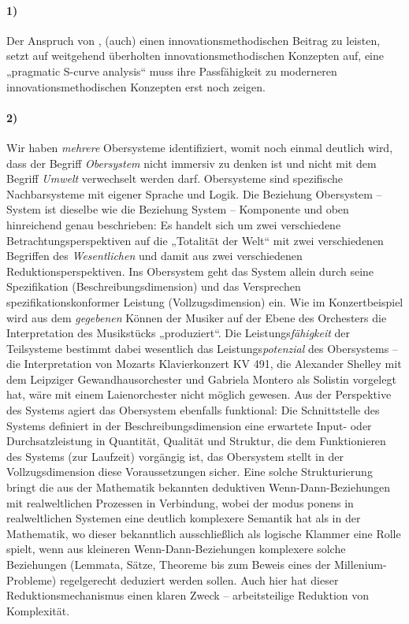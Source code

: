 \documentclass[11pt,a4paper]{article}
\begin{document}
\paragraph{1)}
Der Anspruch von \cite{TESE2018}, (auch) einen innovationsmethodischen Beitrag
zu leisten, setzt auf weitgehend überholten innovationsmethodischen Konzepten
auf, eine „pragmatic S-curve analysis“ muss ihre Passfähigkeit zu moderneren
innovationsmethodischen Konzepten erst noch zeigen.

\paragraph{2)}
Wir haben \emph{mehrere} Obersysteme identifiziert, womit noch einmal deutlich
wird, dass der Begriff \emph{Obersystem} nicht immersiv zu denken ist und
nicht mit dem Begriff \emph{Umwelt} verwechselt werden darf. Obersysteme sind
spezifische Nachbarsysteme mit eigener Sprache und Logik. Die Beziehung
Obersystem -- System ist dieselbe wie die Beziehung System -- Komponente und
oben hinreichend genau beschrieben: Es handelt sich um zwei verschiedene
Betrachtungsperspektiven auf die „Totalität der Welt“ mit zwei verschiedenen
Begriffen des \emph{Wesentlichen} und damit aus zwei verschiedenen
Reduktionsperspektiven. Ins Obersystem geht das System allein durch seine
Spezifikation (Beschreibungsdimension) und das Versprechen
spezifikationskonformer Leistung (Vollzugsdimension) ein. Wie im
Konzertbeispiel wird aus dem \emph{gegebenen} Können der Musiker auf der Ebene
des Orchesters die Interpretation des Musikstücks „produziert“.  Die
Leistungs\emph{fähigkeit} der Teilsysteme bestimmt dabei wesentlich das
Leistungs\emph{potenzial} des Obersystems -- die Interpretation von Mozarts
Klavierkonzert KV 491, die Alexander Shelley mit dem Leipziger
Gewandhausorchester und Gabriela Montero als Solistin vorgelegt hat, wäre mit
einem Laienorchester nicht möglich gewesen. Aus der Perspektive des Systems
agiert das Obersystem ebenfalls funktional: Die Schnittstelle des Systems
definiert in der Beschreibungsdimension eine erwartete Input- oder
Durchsatzleistung in Quantität, Qualität und Struktur, die dem Funktionieren
des Systems (zur Laufzeit) vorgängig ist, das Obersystem stellt in der
Vollzugsdimension diese Voraussetzungen sicher. Eine solche Strukturierung
bringt die aus der Mathematik bekannten deduktiven Wenn-Dann-Beziehungen mit
realweltlichen Prozessen in Verbindung, wobei der modus ponens in
realweltlichen Systemen eine deutlich komplexere Semantik hat als in der
Mathematik, wo dieser bekanntlich ausschließlich als logische Klammer eine
Rolle spielt, wenn aus kleineren Wenn-Dann-Beziehungen komplexere solche
Beziehungen (Lemmata, Sätze, Theoreme bis zum Beweis eines der
Millenium-Probleme) regelgerecht deduziert werden sollen.  Auch hier hat
dieser Reduktionsmechanismus einen klaren Zweck -- arbeitsteilige Reduktion
von Komplexität.
\end{document}
